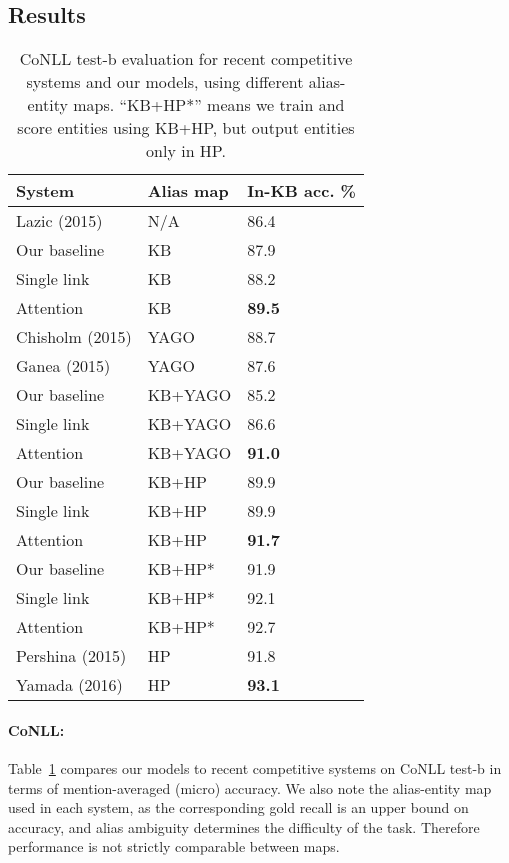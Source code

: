 \subsection{Results}
\begin{table}[t!]
  \centering
  \begin{tabular}{l|l|l}
    System                 &  Alias map  & In-KB acc. \% \\
    \hline
    Lazic (2015)    & N/A          & 86.4 \\
    \hline
    Our baseline    & KB           & 87.9  \\
    Single link     & KB           & 88.2 \\
    Attention       & KB           & \textbf{89.5} \\
    \hline
    Chisholm (2015) & YAGO         & 88.7 \\
    Ganea (2015)    & YAGO         & 87.6 \\
    Our baseline    & KB+YAGO      & 85.2 \\
    Single link     & KB+YAGO      & 86.6 \\
    Attention       & KB+YAGO      & {\bf 91.0} \\
    \hline
    Our baseline    & KB+HP        & 89.9 \\
    Single link & KB+HP & 89.9 \\
    Attention       & KB+HP        & {\bf 91.7} \\
    \hline \hline
    Our baseline &KB+HP* & 91.9 \\
    Single link     & KB+HP*       & 92.1 \\
    Attention       & KB+HP*       & {92.7} \\ \hline
    Pershina (2015) & HP           & 91.8 \\
    Yamada (2016) & HP & {\bf 93.1}
  \end{tabular}
\caption{CoNLL test-b evaluation for recent competitive systems and
  our models, using different alias-entity maps.  ``KB+HP*'' means we
  train and score entities using KB+HP, but output entities only in
  HP.}
 \label{table:conll_results} 
\end{table}

\paragraph*{CoNLL:}
Table~\ref{table:conll_results} compares our models to recent
competitive systems on CoNLL test-b in terms of mention-averaged (micro)
accuracy.  We also note the alias-entity map used in each
system, as the corresponding gold recall is an upper bound on
accuracy, and alias ambiguity determines the difficulty of the task.
Therefore performance is not strictly comparable between maps.

